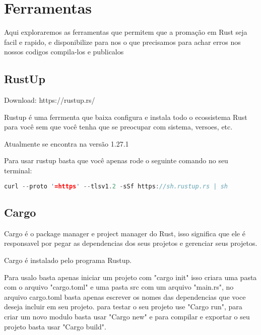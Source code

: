 


\chapter{Ferramentas}

Aqui exploraremos as ferramentas que permitem que a promação em Rust seja facil e rapido, e disponibilize para nos o que precisamos para achar erros nos nossos codigos compila-los e publicalos

    \section{RustUp}

    Download: https://rustup.rs/

    Rustup é uma ferrmenta que baixa configura e instala todo o ecossistema Rust para você sem que você tenha que se preocupar com sistema, versoes, etc.

    Atualmente se encontra na versão 1.27.1

    Para usar rustup basta que você apenas rode o seguinte comando no seu terminal:

    \begin{lstlisting}[language=rust]
      curl --proto '=https' --tlsv1.2 -sSf https://sh.rustup.rs | sh
    \end{lstlisting}


    \section{Cargo}

    Cargo é o package manager e project manager do Rust, isso significa que ele é responsavel por pegar as dependencias dos seus projetos e gerenciar seus projetos.

    Cargo é instalado pelo programa Rustup.

    Para usalo basta apenas iniciar um projeto com "cargo init" isso criara uma pasta com o arquivo "cargo.toml" e uma pasta src com um arquivo "main.rs", no arquivo cargo.toml basta apenas escrever os nomes das dependencias que voce deseja incluir em seu projeto. para testar o seu projeto use "Cargo run", para criar um novo modulo basta usar "Cargo new" e para compilar e exportar o seu projeto basta usar "Cargo build".
